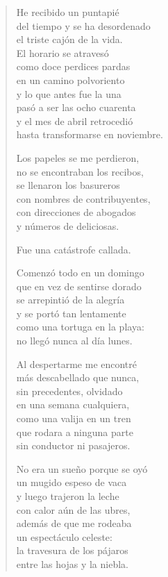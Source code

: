 \documentclass[12pt]{article}
\begin{document}
\clearpage
{}
\begin{verse}

He recibido un puntapié\\
del tiempo y se ha desordenado\\
el triste cajón de la vida.\\
El horario se atravesó\\
como doce perdices pardas\\
en un camino polvoriento\\
y lo que antes fue la una\\
pasó a ser las ocho cuarenta\\
y el mes de abril retrocedió\\
hasta transformarse en noviembre.  

Los papeles se me perdieron,\\
no se encontraban los recibos,\\
se llenaron los basureros\\
con nombres de contribuyentes,\\
con direcciones de abogados\\
y números de deliciosas.  

Fue una catástrofe callada.  

Comenzó todo en un domingo\\
que en vez de sentirse dorado\\
se arrepintió de la alegría\\
y se portó tan lentamente\\
como una tortuga en la playa:\\
no llegó nunca al día lunes.  

Al despertarme me encontré\\
más descabellado que nunca,\\
sin precedentes, olvidado\\
en una semana cualquiera,\\
como una valija en un tren\\
que rodara a ninguna parte\\
sin conductor ni pasajeros.  

No era un sueño porque se oyó\\
un mugido espeso de vaca\\
y luego trajeron la leche\\
con calor aún de las ubres,\\
además de que me rodeaba\\
un espectáculo celeste:\\
la travesura de los pájaros\\
entre las hojas y la niebla.  


\end{verse}
\end{document}
